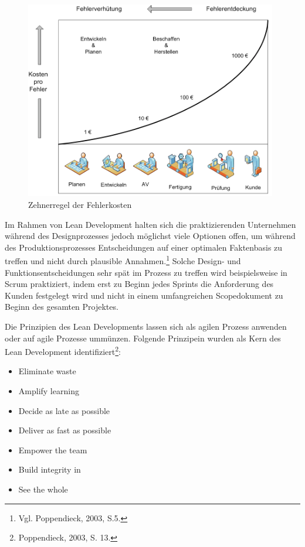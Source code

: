                 \begin{figure}[!htbp]
                        \begin{center}
                        \includegraphics[width=11cm]{Abbildungen/zehnerregel}
                        \caption{Zehnerregel der Fehlerkosten\protect\footnotemark}
                        \label{abb:zehnerregel}
                        \end{center}
                \end{figure}


                Im Rahmen von Lean Development halten sich die praktizierenden Unternehmen während des Designprozesses jedoch möglichst viele Optionen offen, um während des Produktionsprozesses Entscheidungen auf einer optimalen Faktenbasis zu treffen und nicht durch plausible Annahmen.\footnote{Vgl. Poppendieck, 2003, S.5.} Solche Design- und Funktionsentscheidungen sehr spät im Prozess zu treffen wird beispielsweise in Scrum praktiziert, indem erst zu Beginn jedes Sprints die Anforderung des Kunden festgelegt wird und nicht in einem umfangreichen Scopedokument zu Beginn des gesamten Projektes.

                Die Prinzipien des Lean Developments lassen sich als agilen Prozess anwenden oder auf agile Prozesse ummünzen. Folgende Prinzipein wurden als Kern des Lean Development identifiziert\footnote{Poppendieck, 2003, S. 13.}:

                \begin{itemize}
                  \item Eliminate waste
                  \item Amplify learning
                  \item Decide as late as possible
                  \item Deliver as fast as possible
                  \item Empower the team
                  \item Build integrity in
                  \item See the whole
                \end{itemize}

